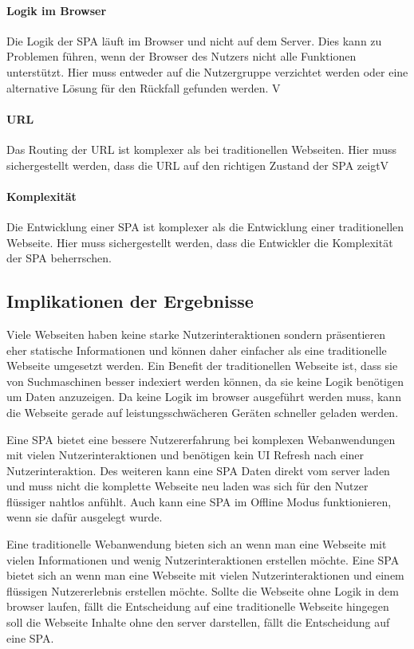\paragraph*{Logik im Browser}
Die Logik der \ac{SPA} läuft im Browser und nicht auf dem Server. Dies kann zu Problemen führen, wenn der Browser des Nutzers
nicht alle Funktionen unterstützt. Hier muss entweder auf die Nutzergruppe verzichtet werden oder eine alternative Lösung für den Rückfall gefunden werden.
V\paragraph*{\ac{URL}}
Das Routing der \ac{URL} ist komplexer als bei traditionellen Webseiten. Hier muss sichergestellt werden, dass die \ac{URL}
auf den richtigen Zustand der \ac{SPA} zeigtV
\paragraph*{Komplexität}
Die Entwicklung einer \ac{SPA} ist komplexer als die Entwicklung einer traditionellen Webseite. Hier muss sichergestellt werden,
dass die Entwickler die Komplexität der \ac{SPA} beherrschen.

\subsection{Implikationen der Ergebnisse}
Viele Webseiten haben keine starke Nutzerinteraktionen sondern präsentieren eher statische Informationen und können daher
einfacher als eine traditionelle Webseite umgesetzt werden.
Ein Benefit der traditionellen Webseite ist, dass sie von Suchmaschinen besser indexiert werden können, da sie keine Logik benötigen um Daten anzuzeigen.
Da keine Logik im \gls{browser} ausgeführt werden muss, kann die Webseite gerade auf leistungsschwächeren Geräten schneller geladen werden.

Eine \ac{SPA} bietet eine bessere Nutzererfahrung bei komplexen Webanwendungen mit vielen Nutzerinteraktionen und benötigen kein \ac{UI} Refresh nach einer Nutzerinteraktion.
Des weiteren kann eine \ac{SPA} Daten direkt vom \gls{server} laden und muss nicht die komplette Webseite neu laden was sich für den Nutzer flüssiger nahtlos anfühlt.
Auch kann eine \ac{SPA} im Offline Modus funktionieren, wenn sie dafür ausgelegt wurde.

Eine traditionelle Webanwendung bieten sich an wenn man eine Webseite mit vielen Informationen und wenig Nutzerinteraktionen erstellen möchte.
Eine \ac{SPA} bietet sich an wenn man eine Webseite mit vielen Nutzerinteraktionen und einem flüssigen Nutzererlebnis erstellen möchte.
Sollte die Webseite ohne Logik in dem \gls{browser} laufen, fällt die Entscheidung auf eine traditionelle Webseite hingegen
soll die Webseite Inhalte ohne den \gls{server} darstellen, fällt die Entscheidung auf eine \ac{SPA}.